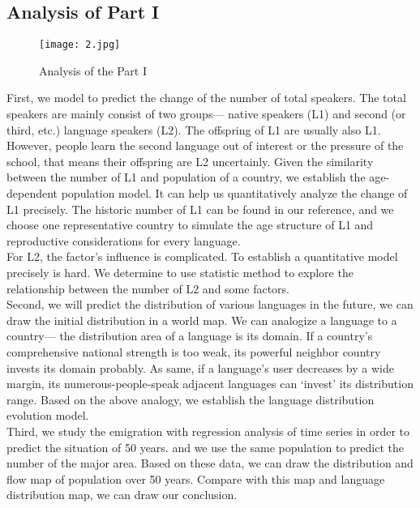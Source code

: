 \documentclass{mcmthesis}
\begin{document}
\subsection{Analysis of Part I}
\begin{figure}[htbp]
\small
\centering
\texttt{[image: 2.jpg]}
\caption{Analysis of the Part I} \label{Analysis of the Part I}
\end{figure}
First, we model to predict the change of the number of  total speakers. The total speakers are mainly consist of two groups--- native speakers (L1) and second  (or third, etc.) language speakers (L2). The offspring of L1 are usually also L1. However, people learn the second language out of interest or the pressure of the school, that means their offspring are L2 uncertainly. Given the similarity between the number of L1 and population of a country,  we establish the age-dependent population model. It can help us quantitatively analyze the change of L1 precisely. The historic number of L1 can be found in our reference, and we choose one representative country to simulate the age structure of L1 and reproductive considerations for every language.\\
\indent For L2, the factor's influence is complicated. To establish a quantitative model precisely is hard. We determine to use statistic method to explore the relationship between the number of L2 and some factors.\\
\indent Second, we will predict the distribution of various languages in the future, we can draw the initial distribution in a world map. We can analogize a language to a country--- the distribution area of a language is its domain. If a country's comprehensive national strength is too weak, its powerful neighbor country invests its domain probably. As same, if a language's user decreases by a wide margin, its numerous-people-speak adjacent languages can `invest' its distribution range. Based on the above analogy, we establish the language distribution evolution model.\\
\indent Third, we study the emigration with regression analysis of time series in order to predict the situation of 50 years. and we use the same population to predict the number of the major area. Based on these data, we can draw the distribution and flow map of population over 50 years. Compare with this map and language distribution map, we can draw our conclusion. 
\end{document}
